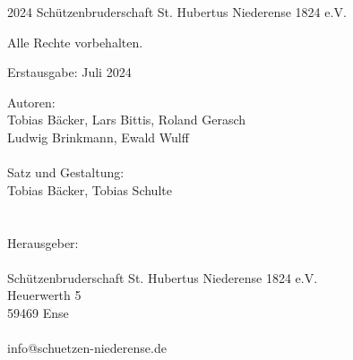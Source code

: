\begingroup
\footnotesize
\parindent 0pt
\parskip \baselineskip
\textcopyright{} 2024 Schützenbruderschaft St. Hubertus Niederense 1824 e.V.

Alle Rechte vorbehalten.

\lipsum[1-1]


\vfill

Erstausgabe: Juli 2024

Autoren: \\
\hspace*{2em} Tobias Bäcker, Lars Bittis, Roland Gerasch \\
\hspace*{2em} Ludwig Brinkmann, Ewald Wulff \\
\\
Satz und Gestaltung: \\
\hspace*{2em} Tobias Bäcker, Tobias Schulte \\
\\
\\
Herausgeber: \\
\\
\hspace*{2em} Schützenbruderschaft St. Hubertus Niederense 1824 e.V. \\
\hspace*{2em} Heuerwerth 5 \\
\hspace*{2em} 59469 Ense \\
\\
\hspace*{2em} info@schuetzen-niederense.de

\endgroup
\clearpage